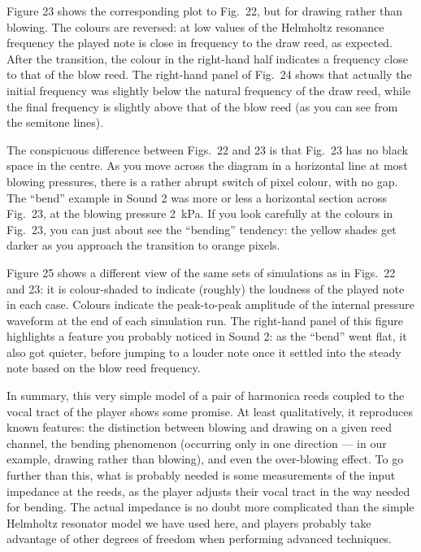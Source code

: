 

  Figure 23 shows the corresponding plot to Fig.\ 22, but for drawing rather 
  than blowing. The colours are reversed: at low values of the Helmholtz 
  resonance frequency the played note is close in frequency to the draw reed, 
  as expected. After the transition, the colour in the right-hand half 
  indicates a frequency close to that of the blow reed. The right-hand panel of 
  Fig.\ 24 shows that actually the initial frequency was slightly below the 
  natural frequency of the draw reed, while the final frequency is slightly 
  above that of the blow reed (as you can see from the semitone lines). 

  The conspicuous difference between Figs.\ 22 and 23 is that Fig.\ 23 has no 
  black space in the centre. As you move across the diagram in a horizontal 
  line at most blowing pressures, there is a rather abrupt switch of pixel 
  colour, with no gap. The “bend” example in Sound 2 was more or less a 
  horizontal section across Fig.\ 23, at the blowing pressure 2~kPa. If you 
  look carefully at the colours in Fig.\ 23, you can just about see the 
  “bending” tendency: the yellow shades get darker as you approach the 
  transition to orange pixels. 

  Figure 25 shows a different view of the same sets of simulations as in Figs.\ 
  22 and 23: it is colour-shaded to indicate (roughly) the loudness of the 
  played note in each case. Colours indicate the peak-to-peak amplitude of the 
  internal pressure waveform at the end of each simulation run. The right-hand 
  panel of this figure highlights a feature you probably noticed in Sound 2: as 
  the “bend” went flat, it also got quieter, before jumping to a louder note 
  once it settled into the steady note based on the blow reed frequency. 



  In summary, this very simple model of a pair of harmonica reeds coupled to 
  the vocal tract of the player shows some promise. At least qualitatively, it 
  reproduces known features: the distinction between blowing and drawing on a 
  given reed channel, the bending phenomenon (occurring only in one direction — 
  in our example, drawing rather than blowing), and even the over-blowing 
  effect. To go further than this, what is probably needed is some measurements 
  of the input impedance at the reeds, as the player adjusts their vocal tract 
  in the way needed for bending. The actual impedance is no doubt more 
  complicated than the simple Helmholtz resonator model we have used here, and 
  players probably take advantage of other degrees of freedom when performing 
  advanced techniques. 

